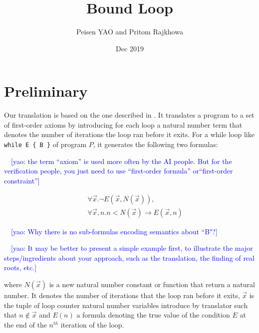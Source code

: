 \documentclass[12pt]{extarticle}
\title{Bound Loop}
\author{Peisen YAO and Pritom Rajkhowa}
\date{Dec 2019}
\theoremstyle{definition}
\newcommand{\yao}[1]{\mytodoblue{[yao: #1]}}
\newcommand{\mytodoblue}[1]{\textcolor{blue}{\ding{46}~{\sf}~#1}}
\begin{document}
\maketitle
\section{Preliminary}
Our translation is based on the one described in \cite{Lin20161}.
It translates a program to
a set of first-order axioms by introducing for each loop a natural number
term that denotes the number of iterations the loop ran before it exits. For a while loop like \verb- while E { B }-  of program $P$, it generates the following two formulas:

\yao{the term ``axiom'' is used more often by the AI people. But for the verification people, you just need to use ``first-order formula'' or``first-order constraint''}

\begin{eqnarray}
&&  \forall \vec{x}.\neg E(\vec{x},N(\vec{x})), \label{smallest1}\\
&& \forall \vec{x},n. n< N(\vec{x})\rightarrow  E(\vec{x},n) \label{smallest2}
\end{eqnarray}

\yao{Why there is no sub-formulas encoding semantics about ``B"?}

\yao{It may be better to present a simple example first, to illustrate the major steps/ingredients about your approach, such as the translation, the finding of real roots, etc.}

where $N(\vec{x})$ is a new natural number constant or  function that return a natural number. It denotes the number of iterations that the loop ran before it exits, $\vec{x}$ is the tuple of loop counter natural number variables introduce by translator such that $n \not\in \vec{x}$ and  $E(n)$ a formula denoting the true value of the condition $E$ at the end of the $n^{th}$ iteration of the loop.
\end{document}

